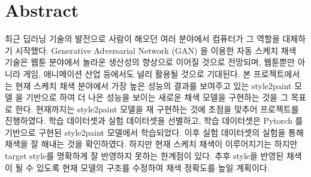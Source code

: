 \section{Abstract}

최근 딥러닝 기술의 발전으로 사람이 해오던 여러 분야에서 컴퓨터가 그 역할을 대체하기 시작했다. Generative Adversarial Network (GAN) \cite{Goodfellow2014}을 이용한 자동 스케치 채색 기술은 웹툰 분야에서 놀라운 생산성의 향상으로 이어질 것으로 전망되며, 웹툰뿐만 아니라 게임, 애니메이션 산업 등에서도 널리 활용될 것으로 기대된다. 본 프로젝트에서는 현재 스케치 채색 분야에서 가장 높은 성능의 결과를 보여주고 있는 style2paint 모델 \cite{Zhang2017}을 기반으로 하여 더 나은 성능을 보이는 새로운 채색 모델을 구현하는 것을 그 목표로 한다. 현재까지는 style2paint 모델을 재 구현하는 것에 초점을 맞추어 프로젝트를 진행하였다. 
학습 데이터셋과 실험 데이터셋을 선별하고, 학습 데이터셋은 Pytorch \cite{pytorch}를 기반으로 구현된 style2paint 모델에서 학습되었다. 이후 실험 데이터셋의 실험을 통해 채색을 잘 해내는 것을 확인하였다.
하지만 현재 스케치 채색이 이루어지기는 하지만 target style를 명확하게 잘 반영하지 못하는 한계점이 있다. 추후 style을 반영된 채색이 될 수 있도록 현재 모델의 구조를 수정하여 채색 정확도를 높일 계획이다.	